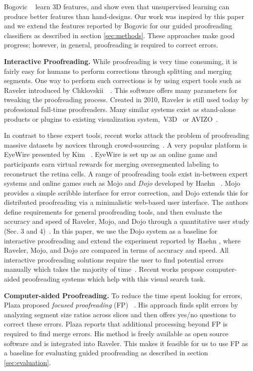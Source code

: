 Bogovic \etal~\cite{BogovicHJ13} learn 3D features, and show even that unsupervised learning can produce better features than hand-designs. Our work was inspired by this paper and we extend the features reported by Bogovic \etal for our guided proofreading classifiers as described in section \ref{sec:methods}.
These approaches make good progress; however, in general, proofreading is required to correct errors. 

\textbf{Interactive Proofreading.} While proofreading is very time consuming, it is fairly easy for humans to perform corrections through splitting and merging segments. One way to perform such corrections is by using expert tools such as Raveler introduced by Chklovskii~\etal~\cite{chklovskii2010, raveler}. This software offers many parameters for tweaking the proofreading process. Created in 2010, Raveler is still used today by professional full-time proofreaders. Many similar systems exist as stand-alone products or plugins to existing visualization system,~\eg V3D~\cite{proofreading_bottleneck} or AVIZO~\cite{markus_proofreading}. 

In contrast to these expert tools, recent works attack the problem of proofreading massive datasets by novices through crowd-sourcing~\cite{saalfeld09,anderson2011,Giuly2013DP2}. A very popular platform is EyeWire presented by Kim \etal~\cite{eyewire_nature}. EyeWire is set up as an online game and participants earn virtual rewards for merging oversegmented labeling to reconstruct the retina cells.
A range of proofreading tools exist in-between expert systems and online games such as Mojo and \textit{Dojo} developed by Haehn \etal~\cite{haehn_dojo_2014,Neuroblocks}. Mojo provides a simple scribble interface for error correction, and Dojo extends this for distributed proofreading via a minimalistic web-based user interface. The authors define requirements for general proofreading tools, and then evaluate the accuracy and speed of Raveler, Mojo, and Dojo through a quantitative user study (Sec. 3 and 4)~\cite{haehn_dojo_2014}. In this paper, we use the Dojo system as a baseline for interactive proofreading and extend the experiment reported by Haehn \etal, where Raveler, Mojo, and Dojo are compared in terms of accuracy and speed.
All interactive proofreading solutions require the user to find potential errors manually which takes the majority of time~\cite{proofreading_bottleneck,haehn_dojo_2014}. Recent works propose computer-aided proofreading systems which help with this visual search task.

\textbf{Computer-aided Proofreading.} To reduce the time spent looking for errors, Plaza proposed \textit{focused proofreading} (FP) ~\cite{focused_proofreading}. His approach finds split errors by analyzing segment size ratios across slices and then offers yes/no questions to correct these errors. Plaza reports that additional processing beyond FP is required to find merge errors. His method is freely available as open source software and is integrated into Raveler. This makes it feasible for us to use FP as a baseline for evaluating guided proofreading as described in section \ref{sec:evaluation}.

